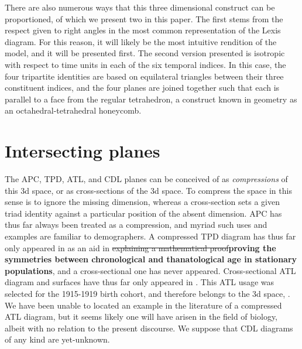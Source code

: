 \documentclass[11pt,oneside,a4paper]{article} %
\begin{document}
There are also
numerous ways that this three dimensional construct can be proportioned, of
which we present two in this paper. The first stems from the respect given to
right angles in the most common representation of the Lexis diagram. For this reason, it will likely be
the most intuitive rendition of the model, and it will be presented first. The
second version presented is isotropic with respect to time units in each of the
six temporal indices. In this case, the four tripartite identities are based on
equilateral triangles between their three constituent indices, and the four
planes are joined together such that each is parallel to a face from the regular
tetrahedron, a construct known in geometry as an octahedral-tetrahedral
honeycomb.

\section*{Intersecting planes}

The APC, TPD, ATL, and CDL planes can be conceived of as
\textit{compressions} of this 3d space, or as cross-sections of the 3d space. To
compress the space in this sense is to ignore the missing dimension,
whereas a cross-section sets a given triad identity against a particular
position of the absent dimension. APC has thus far always been treated as a
compression, and myriad such uses and examples are familiar to demographers.
A compressed TPD diagram has thus far only appeared in \citet{pancho2015}
as an aid in \sout{explaining a mathematical proof}\textbf{proving the symmetries between chronological and thanatological age in stationary populations}, and a cross-sectional one has
never appeared.
Cross-sectional ATL diagram and surfaces have thus far only appeared in
\citet{riffe2015ttd}. This ATL usage was selected for the 1915-1919 birth
cohort, and therefore belongs to the 3d
space,
.
We have been unable to located an example in the literature of a compressed
ATL diagram, but it seems likely one will have arisen in the field of
biology, albeit with no relation to the present discourse. We suppose
that CDL diagrams of any kind are yet-unknown.
\end{document}
